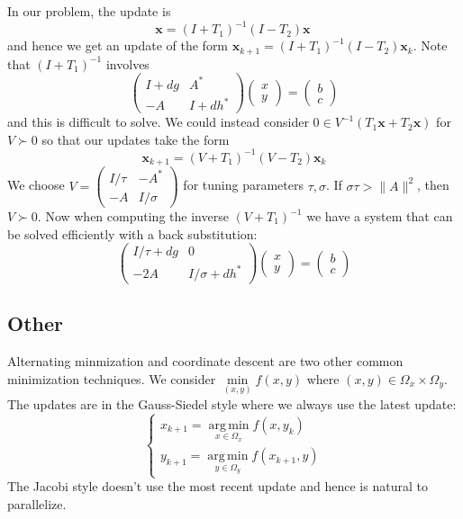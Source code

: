 \documentclass[english, 11pt]{article}
\DeclareMathOperator*{\argmin}{arg\,min}
\begin{document}
 In our problem, the update is
 \[
 \mathbf{x} = (I + T_1)^{-1} (I - T_2)\mathbf{x} \
 \]
 and hence we get an update of the form $ \mathbf{x}_{k+1} = (I + T_1)^{-1} (I - T_2)\mathbf{x}_k$. Note that
 $
 (I+T_1)^{-1}
 $ involves 
 \[
 \begin{pmatrix} I + dg & A^* \\ -A & I  + dh^* \end{pmatrix} \begin{pmatrix} x \\ y \end{pmatrix} = \begin{pmatrix} b \\ c \end{pmatrix}
 \]
 and this is difficult to solve. We could instead consider $0 \in V^{-1} (T_1 \mathbf{x} + T_2 \mathbf{x})$ for $V \succ 0$ so that our updates take the form
 \[
  \mathbf{x}_{k+1} = (V+ T_1)^{-1} (V - T_2)\mathbf{x}_k
 \]
 We choose $V = \begin{pmatrix} I / \tau & - A^* \\ -A & I / \sigma \end{pmatrix}$ for tuning parameters $\tau,\sigma$. If $\sigma \tau > \|A\|^2$, then $V \succ 0$. Now when computing the inverse $(V + T_1)^{-1}$ we have a system that can be solved efficiently with a back substitution:
 \[
  \begin{pmatrix} I/\tau + dg & 0 \\ -2A & I/\sigma  + dh^* \end{pmatrix} \begin{pmatrix} x \\ y \end{pmatrix} = \begin{pmatrix} b \\ c \end{pmatrix}
 \]
 
 \subsection{Other}
 Alternating minmization and coordinate descent are two other common minimization techniques. We consider $\min \limits_{(x,y)} f(x,y)$ where $(x,y ) \in \Omega_x \times \Omega_y$. The updates are in the Gauss-Siedel style where we always use the latest update:
 \[
 \begin{cases}
 x_{k+1} = \argmin \limits_{x \in \Omega_x} f(x,y_k) \\
 y_{k+1} = \argmin \limits_{y \in \Omega_y} f(x_{k+1},y)
 \end{cases}
 \]
 The Jacobi style doesn't use the most recent update and hence is natural to parallelize.
\end{document}
